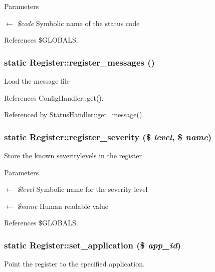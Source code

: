 \begin{DoxyParams}{Parameters}
\item[\mbox{$\leftarrow$} {\em \$code}]Symbolic name of the status code \end{DoxyParams}


References \$GLOBALS.

\subsubsection[{register\_\-messages}]{\setlength{\rightskip}{0pt plus 5cm}static Register::register\_\-messages ()}\label{classRegister_a688c665a20294826a762cf552b4a00fc}
Load the message file 

References ConfigHandler::get().



Referenced by StatusHandler::get\_\-message().

\subsubsection[{register\_\-severity}]{\setlength{\rightskip}{0pt plus 5cm}static Register::register\_\-severity (\$ {\em level}, \/  \$ {\em name})}\label{classRegister_ac22a104eefa471675cb28ee20821eaad}
Store the known severitylevels in the register


\begin{DoxyParams}{Parameters}
\item[\mbox{$\leftarrow$} {\em \$level}]Symbolic name for the severity level \item[\mbox{$\leftarrow$} {\em \$name}]Human readable value \end{DoxyParams}


References \$GLOBALS.

\subsubsection[{set\_\-application}]{\setlength{\rightskip}{0pt plus 5cm}static Register::set\_\-application (\$ {\em app\_\-id})}\label{classRegister_ad4d61787414f7d64d1e3420f0fdf3f91}
Point the register to the specified application.



